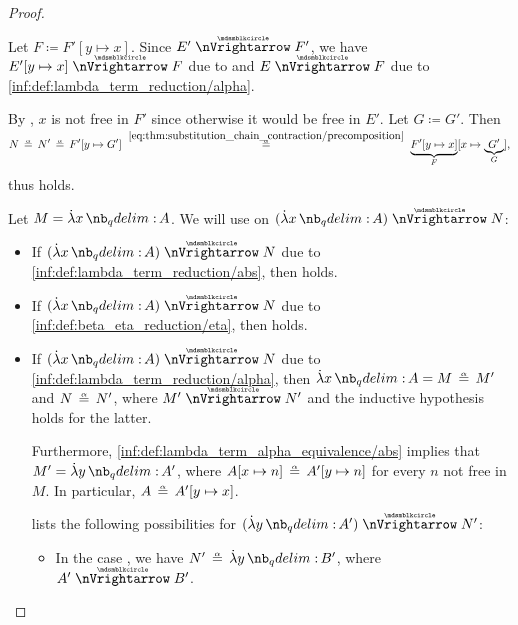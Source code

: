 \begin{proof}
\begin{itemize}
\begin{itemize}
\begin{itemize}
        Let \( F \coloneqq F'[y \mapsto x] \). Since \( E' \ppred F' \), we have \( E'[y \mapsto x] \ppred F \) due to  and \( E \ppred F \) due to \ref{inf:def:lambda_term_reduction/alpha}.

        By , \( x \) is not free in \( F' \) since otherwise it would be free in \( E' \). Let \( G \coloneqq G' \). Then
        \begin{equation*}
          N
          \aequiv
          N'
          \aequiv
          F'[y \mapsto G']
          \reloset {\eqref{eq:thm:substitution_chain_contraction/precomposition}} \aequiv
          \underbrace{F'[y \mapsto x]}_F [x \mapsto \underbrace{G'}_G],
        \end{equation*}
        thus  holds.
      \end{itemize}
    \end{itemize}
  \end{itemize}

   Let \( M = \qabs x A \). We will use  on \( (\qabs x A) \ppred N \):
  \begin{itemize}
    \item If \( (\qabs x A) \ppred N \) due to \ref{inf:def:lambda_term_reduction/abs}, then  holds.

    \item If \( (\qabs x A) \ppred N \) due to \ref{inf:def:beta_eta_reduction/eta}, then  holds.

    \item If \( (\qabs x A) \ppred N \) due to \ref{inf:def:lambda_term_reduction/alpha}, then \( \qabs x A = M \aequiv M' \) and \( N \aequiv N' \), where \( M' \ppred N' \) and the inductive hypothesis holds for the latter.

    Furthermore, \ref{inf:def:lambda_term_alpha_equivalence/abs} implies that \( M' = \qabs y A' \), where \( A[x \mapsto n] \aequiv A'[y \mapsto n] \) for every \( n \) not free in \( M \). In particular, \( A \aequiv A'[y \mapsto x] \).

     lists the following possibilities for \( (\qabs y A') \ppred N' \):
    \begin{itemize}
      \item In the case , we have \( N' \aequiv \qabs y B' \), where \( A' \ppred B' \).


\end{itemize}
\end{itemize}
\end{proof}
